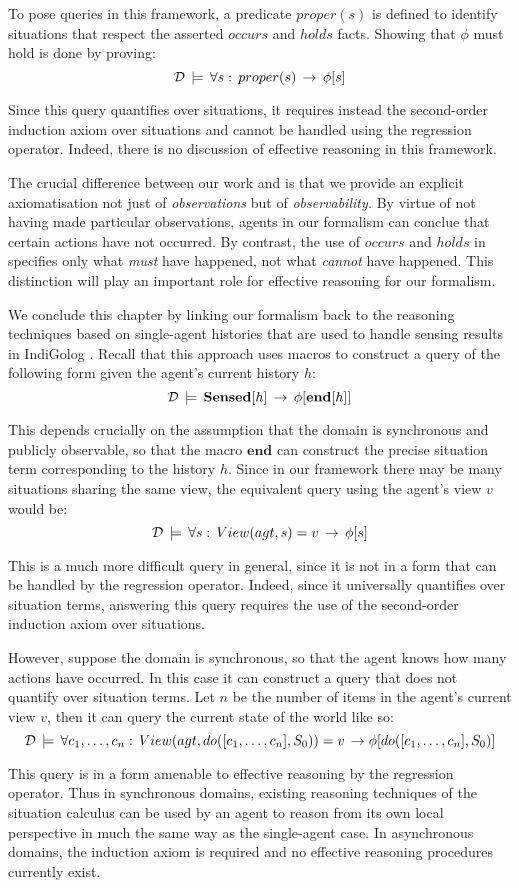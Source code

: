 To pose queries in this framework, a predicate $proper(s)$ is defined
to identify situations that respect the asserted $occurs$ and $holds$
facts. Showing that $\phi$ must hold is done by proving:\[
\mathcal{D}\,\models\,\forall s:\, proper(s)\,\rightarrow\,\phi[s]\]


Since this query quantifies over situations, it requires instead the
second-order induction axiom over situations and cannot be handled
using the regression operator. Indeed, there is no discussion of effective
reasoning in this framework.

The crucial difference between our work and \citep{pinto98sc_observations}
is that we provide an explicit axiomatisation not just of \emph{observations}
but of \emph{observability.} By virtue of not having made particular
observations, agents in our formalism can conclue that certain actions
have not occurred. By contrast, the use of $occurs$ and $holds$
in \citep{pinto98sc_observations} specifies only what \emph{must}
have happened, not what \emph{cannot} have happened. This distinction
will play an important role for effective reasoning for our formalism.

We conclude this chapter by linking our formalism back to the reasoning
techniques based on single-agent histories that are used to handle
sensing results in IndiGolog \citep{giacomo99indigolog}. Recall that
this approach uses macros to construct a query of the following form
given the agent's current history $h$:\[
\mathcal{D}\,\models\,\mathbf{Sensed}[h]\,\rightarrow\,\phi[\mathbf{end}[h]]\]


This depends crucially on the assumption that the domain is synchronous
and publicly observable, so that the macro $\mathbf{end}$ can construct
the precise situation term corresponding to the history $h$. Since
in our framework there may be many situations sharing the same view,
the equivalent query using the agent's view $v$ would be:\[
\mathcal{D}\,\models\,\forall s:\, View(agt,s)=v\,\rightarrow\,\phi[s]\]


This is a much more difficult query in general, since it is not in
a form that can be handled by the regression operator. Indeed, since
it universally quantifies over situation terms, answering this query
requires the use of the second-order induction axiom over situations.

However, suppose the domain is synchronous, so that the agent knows
how many actions have occurred. In this case it can construct a query
that does not quantify over situation terms. Let $n$ be the number
of items in the agent's current view $v$, then it can query the current
state of the world like so:\[
\mathcal{D}\,\models\,\forall c_{1},\dots,c_{n}:\, View(agt,do([c_{1},\dots,c_{n}],S_{0}))=v\,\rightarrow\phi[do([c_{1},\dots,c_{n}],S_{0})]\]


This query is in a form amenable to effective reasoning by the regression
operator. Thus in synchronous domains, existing reasoning techniques
of the situation calculus can be used by an agent to reason from its
own local perspective in much the same way as the single-agent case.
In asynchronous domains, the induction axiom is required and no effective
reasoning procedures currently exist.


